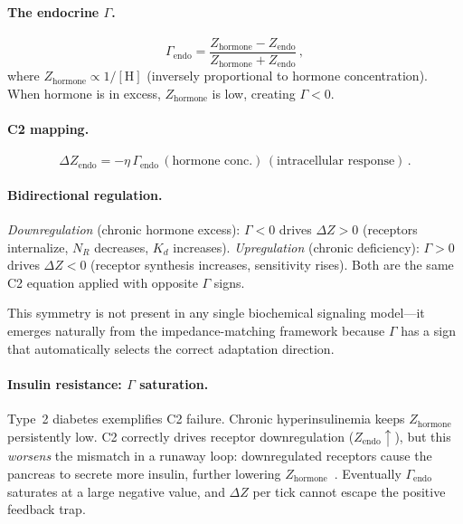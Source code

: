 \documentclass[aps,pre,twocolumn,superscriptaddress,floatfix]{revtex4-2}
\begin{document}
\paragraph{The endocrine $\Gamma$.}
\begin{equation}
  \Gamma_{\text{endo}} =
  \frac{Z_{\text{hormone}} - Z_{\text{endo}}}
       {Z_{\text{hormone}} + Z_{\text{endo}}}\,,
  \label{eq:gamma-endo}
\end{equation}
where $Z_{\text{hormone}} \propto 1/[\text{H}]$
(inversely proportional to hormone concentration).
When hormone is in excess, $Z_{\text{hormone}}$
is low, creating $\Gamma < 0$.

\paragraph{C2 mapping.}
\begin{equation}
  \Delta Z_{\text{endo}} =
  -\eta\,\Gamma_{\text{endo}}\,
  (\text{hormone conc.})\,
  (\text{intracellular response})\,.
  \label{eq:c2-endo}
\end{equation}

\paragraph{Bidirectional regulation.}
\emph{Downregulation} (chronic hormone excess):
$\Gamma < 0$ drives $\Delta Z > 0$
(receptors internalize, $N_R$ decreases,
$K_d$ increases).
\emph{Upregulation} (chronic deficiency):
$\Gamma > 0$ drives $\Delta Z < 0$
(receptor synthesis increases, sensitivity rises).
Both are the same C2 equation applied with
opposite $\Gamma$ signs.

This symmetry is not present in any single
biochemical signaling model---it emerges
naturally from the impedance-matching framework
because $\Gamma$ has a sign that automatically
selects the correct adaptation direction.

\paragraph{Insulin resistance: $\Gamma$ saturation.}
Type~2 diabetes exemplifies C2 failure.
Chronic hyperinsulinemia keeps
$Z_{\text{hormone}}$ persistently low.
C2 correctly drives receptor downregulation
($Z_{\text{endo}} \uparrow$), but this
\emph{worsens} the mismatch in a runaway loop:
downregulated receptors cause the pancreas to
secrete more insulin, further lowering
$Z_{\text{hormone}}$~\cite{Kahn2006}.
Eventually $\Gamma_{\text{endo}}$ saturates at
a large negative value, and
$\Delta Z$ per tick cannot escape the positive
feedback trap.
\end{document}
